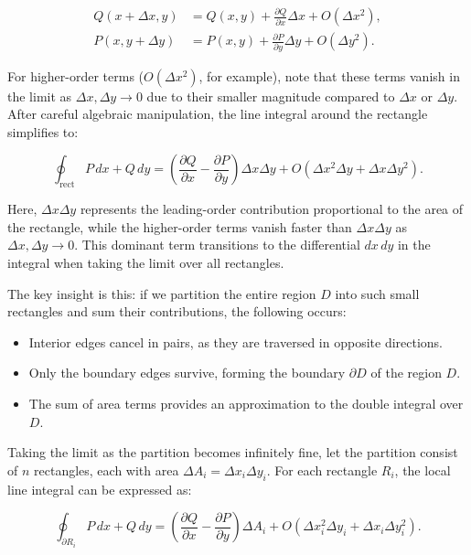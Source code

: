\begin{align*}
Q(x+\Delta x,y) &= Q(x,y) + \frac{\partial Q}{\partial x}\Delta x + O(\Delta x^2), \\
P(x,y+\Delta y) &= P(x,y) + \frac{\partial P}{\partial y}\Delta y + O(\Delta y^2).
\end{align*}

\noindent For higher-order terms ($O(\Delta x^2)$, for example), note that these terms vanish in the limit as $\Delta x, \Delta y \to 0$ due to their smaller magnitude compared to $\Delta x$ or $\Delta y$. After careful algebraic manipulation, the line integral around the rectangle simplifies to:

\[
\oint_{\text{rect}} P\,dx + Q\,dy = \left(\frac{\partial Q}{\partial x} - \frac{\partial P}{\partial y}\right)\Delta x\Delta y + O(\Delta x^2\Delta y + \Delta x\Delta y^2).
\]

\noindent Here, $\Delta x\Delta y$ represents the leading-order contribution proportional to the area of the rectangle, while the higher-order terms vanish faster than $\Delta x\Delta y$ as $\Delta x, \Delta y \to 0$. This dominant term transitions to the differential $dx\,dy$ in the integral when taking the limit over all rectangles.

\bigskip

\noindent The key insight is this: if we partition the entire region $D$ into such small rectangles and sum their contributions, the following occurs:

\begin{itemize}
    \item Interior edges cancel in pairs, as they are traversed in opposite directions.
    \item Only the boundary edges survive, forming the boundary $\partial D$ of the region $D$.
    \item The sum of area terms provides an approximation to the double integral over $D$.
\end{itemize}

\bigskip

\noindent Taking the limit as the partition becomes infinitely fine, let the partition consist of $n$ rectangles, each with area $\Delta A_i = \Delta x_i\Delta y_i$. For each rectangle $R_i$, the local line integral can be expressed as:

\[
\oint_{\partial R_i} P\,dx + Q\,dy = \left(\frac{\partial Q}{\partial x} - \frac{\partial P}{\partial y}\right)\Delta A_i + O(\Delta x_i^2\Delta y_i + \Delta x_i\Delta y_i^2).
\]

